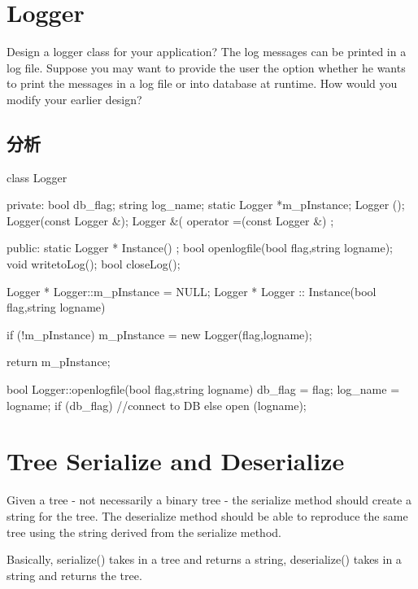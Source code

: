 \section{Logger}
Design a logger class for your application? The log messages can be printed in a log file.
Suppose you may want to provide the user the option whether he wants to print the messages in a log file or into database at runtime. How would you modify your earlier design?

\subsection{分析}
\begin{Code}
	class Logger {
		private:
		bool db_flag;
		string log_name;
		static Logger *m_pInstance;
		Logger (){};
		Logger(const Logger &);
		Logger &( operator =(const Logger &) {};
		
		
		public:
		static Logger * Instance() {};
		bool openlogfile(bool flag,string logname);
		void writetoLog();
		bool closeLog();
		
	}
	
	Logger * Logger::m_pInstance = NULL;
	Logger * Logger :: Instance(bool flag,string logname) {
		if (!m_pInstance)
		m_pInstance = new Logger(flag,logname);
		
		return m_pInstance;
	}
	
	bool Logger::openlogfile(bool flag,string logname) {
		db_flag = flag;
		log_name = logname;
		if (db_flag){
			//connect to DB
		} else
		open (logname);
	}
\end{Code}

\section{Tree Serialize and Deserialize}
Given a tree - not necessarily a binary tree - the serialize method should create a string for the tree. The deserialize method should be able to reproduce the same tree using the
string derived from the serialize method.

Basically, serialize() takes in a tree and returns a string, deserialize() takes in a string and returns the tree.

